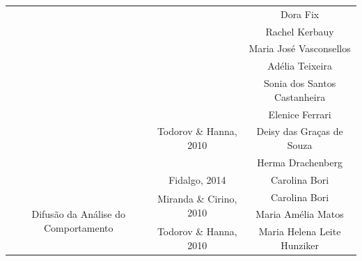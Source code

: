 \begin{table}[tbp]
\begin{adjustbox}{max width=1\textwidth}
\begin{tabular}{@{}ccc@{}}
\multicolumn{1}{c|}{}                                                      & \multicolumn{1}{c|}{}                                         & Dora Fix                                    \\
\multicolumn{1}{c|}{}                                                      & \multicolumn{1}{c|}{}                                         & Rachel Kerbauy                              \\
\multicolumn{1}{c|}{}                                                      & \multicolumn{1}{c|}{}                                         & Maria José Vasconsellos                     \\
\multicolumn{1}{c|}{}                                                      & \multicolumn{1}{c|}{}                                         & Adélia Teixeira                             \\
\multicolumn{1}{c|}{}                                                      & \multicolumn{1}{c|}{}                                         & Sonia dos Santos Castanheira                \\ \cmidrule(l){2-3} 
\multicolumn{1}{c|}{}                                                      & \multicolumn{1}{c|}{\multirow{3}{*}{Todorov \& Hanna, 2010}}  & Elenice Ferrari                             \\
\multicolumn{1}{c|}{}                                                      & \multicolumn{1}{c|}{}                                         & Deisy das Graças de Souza                   \\
\multicolumn{1}{c|}{}                                                      & \multicolumn{1}{c|}{}                                         & Herma Drachenberg                           \\ \cmidrule(l){2-3} 
\multicolumn{1}{c|}{}                                                      & \multicolumn{1}{c|}{Fidalgo, 2014}                            & Carolina Bori                               \\ \midrule
\multicolumn{1}{c|}{\multirow{16}{*}{Difusão da Análise do Comportamento}} & \multicolumn{1}{c|}{\multirow{2}{*}{Miranda \& Cirino, 2010}} & Carolina Bori                               \\
\multicolumn{1}{c|}{}                                                      & \multicolumn{1}{c|}{}                                         & Maria Amélia Matos                          \\ \cmidrule(l){2-3} 
\multicolumn{1}{c|}{}                                                      & \multicolumn{1}{c|}{Todorov \& Hanna, 2010}                   & Maria Helena Leite Hunziker                 \\ \cmidrule(l){2-3} 

\end{tabular}
\end{adjustbox}
\end{table}
